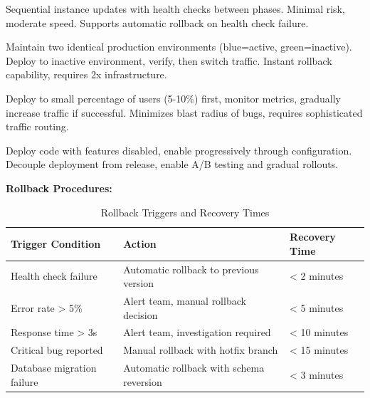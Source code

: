 \documentclass[12pt,a4paper]{article}
\begin{document}
\begin{description}[leftmargin=2em, itemsep=8pt, style=nextline]
    \item[\textbf{Rolling Deployment (Current):}] Sequential instance updates with health checks between phases. Minimal risk, moderate speed. Supports automatic rollback on health check failure.
    
    \item[\textbf{Blue-Green Deployment (Future):}] Maintain two identical production environments (blue=active, green=inactive). Deploy to inactive environment, verify, then switch traffic. Instant rollback capability, requires 2x infrastructure.
    
    \item[\textbf{Canary Deployment (Future):}] Deploy to small percentage of users (5-10\%) first, monitor metrics, gradually increase traffic if successful. Minimizes blast radius of bugs, requires sophisticated traffic routing.
    
    \item[\textbf{Feature Flags (Planned):}] Deploy code with features disabled, enable progressively through configuration. Decouple deployment from release, enable A/B testing and gradual rollouts.
\end{description}

\vspace{0.5em}

\textbf{Rollback Procedures:}

\begin{table}[H]
\centering
\begin{tabular}{|p{4cm}|p{4cm}|p{5cm}|}
\hline
\textbf{Trigger Condition} & \textbf{Action} & \textbf{Recovery Time} \\
\hline
Health check failure & Automatic rollback to previous version & < 2 minutes \\
\hline
Error rate > 5\% & Alert team, manual rollback decision & < 5 minutes \\
\hline
Response time > 3s & Alert team, investigation required & < 10 minutes \\
\hline
Critical bug reported & Manual rollback with hotfix branch & < 15 minutes \\
\hline
Database migration failure & Automatic rollback with schema reversion & < 3 minutes \\
\hline
\end{tabular}
\caption{Rollback Triggers and Recovery Times}
\end{table}
\end{document}
